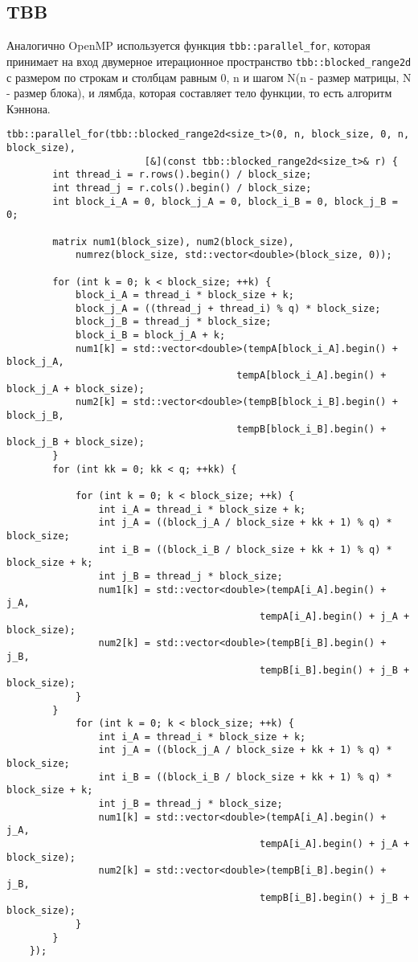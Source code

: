 \documentclass{report}
\begin{document}
\subsection{TBB}
Аналогично OpenMP используется функция \verb|tbb::parallel_for|, которая принимает на вход двумерное итерационное пространство \verb|tbb::blocked_range2d| с размером по строкам и столбцам равным 0, n и шагом N(n - размер матрицы, N - размер блока), и лямбда, которая составляет тело функции, то есть алгоритм Кэннона.
\begin{lstlisting}
tbb::parallel_for(tbb::blocked_range2d<size_t>(0, n, block_size, 0, n, block_size),
                        [&](const tbb::blocked_range2d<size_t>& r) {
        int thread_i = r.rows().begin() / block_size;
        int thread_j = r.cols().begin() / block_size;
        int block_i_A = 0, block_j_A = 0, block_i_B = 0, block_j_B = 0;

        matrix num1(block_size), num2(block_size),
            numrez(block_size, std::vector<double>(block_size, 0));

        for (int k = 0; k < block_size; ++k) {
            block_i_A = thread_i * block_size + k;
            block_j_A = ((thread_j + thread_i) % q) * block_size;
            block_j_B = thread_j * block_size;
            block_i_B = block_j_A + k;
            num1[k] = std::vector<double>(tempA[block_i_A].begin() + block_j_A,
                                        tempA[block_i_A].begin() + block_j_A + block_size);
            num2[k] = std::vector<double>(tempB[block_i_B].begin() + block_j_B,
                                        tempB[block_i_B].begin() + block_j_B + block_size);
        }
        for (int kk = 0; kk < q; ++kk) {
             
            for (int k = 0; k < block_size; ++k) {
                int i_A = thread_i * block_size + k;
                int j_A = ((block_j_A / block_size + kk + 1) % q) * block_size;
                int i_B = ((block_i_B / block_size + kk + 1) % q) * block_size + k;
                int j_B = thread_j * block_size;
                num1[k] = std::vector<double>(tempA[i_A].begin() + j_A,
                                            tempA[i_A].begin() + j_A + block_size);
                num2[k] = std::vector<double>(tempB[i_B].begin() + j_B,
                                            tempB[i_B].begin() + j_B + block_size);
            }
        }
            for (int k = 0; k < block_size; ++k) {
                int i_A = thread_i * block_size + k;
                int j_A = ((block_j_A / block_size + kk + 1) % q) * block_size;
                int i_B = ((block_i_B / block_size + kk + 1) % q) * block_size + k;
                int j_B = thread_j * block_size;
                num1[k] = std::vector<double>(tempA[i_A].begin() + j_A,
                                            tempA[i_A].begin() + j_A + block_size);
                num2[k] = std::vector<double>(tempB[i_B].begin() + j_B,
                                            tempB[i_B].begin() + j_B + block_size);
            }
        }
    });
\end{lstlisting}
\end{document}

